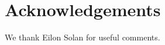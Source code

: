 \documentclass[review]{elsarticle}
\newtheorem{lemma}{Lemma}
\begin{document}
%


%
%
%





\section*{Acknowledgements}
We thank Eilon Solan for useful comments.
 



   
  



\end{document}
